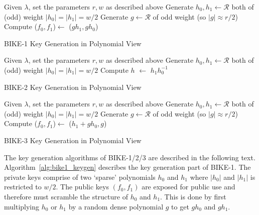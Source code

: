\documentclass[runningheads]{llncs}
\begin{document}
\begin{algorithm}[!tbh]
 \DontPrintSemicolon %
    Given $\lambda$, set the parameters $r,w$ as described above\;
    Generate $h_0,h_1 \gets \mathcal{R}$ both of (odd) weight $|h_0|=|h_1|=w/2$\;
    Generate $g \gets \mathcal{R}$ of odd weight (so $|g|\approx r/2$)\;
    Compute ($f_0,f_1$)$\gets$ ($gh_1,gh_0$)\;
 \caption{BIKE-1 Key Generation in Polynomial View \cite{aragon2017bike}}\label{alg:bike1_keygen}
\end{algorithm}

\begin{algorithm}[!tbh]
 \DontPrintSemicolon %
    Given $\lambda$, set the parameters $r,w$ as described above\;
    Generate $h_0,h_1 \gets \mathcal{R}$ both of (odd) weight $|h_0|=|h_1|=w/2$\;
    Compute $h$ $\gets$ $h_1h_0^{-1}$\;
 \caption{BIKE-2 Key Generation in Polynomial View  \cite{aragon2017bike}}\label{alg:bike2_keygen}
\end{algorithm}

\begin{algorithm}[!tbh]
 \DontPrintSemicolon %
    Given $\lambda$, set the parameters $r,w$ as described above\;
    Generate $h_0,h_1 \gets \mathcal{R}$ both of (odd) weight $|h_0|=|h_1|=w/2$\;
    Generate $g \gets \mathcal{R}$ of odd weight (so $|g|\approx r/2$)\;
    Compute ($f_0,f_1$)$\gets$ ($h_1+gh_0,g$)\;
 \caption{BIKE-3 Key Generation in Polynomial View  \cite{aragon2017bike}}\label{alg:bike3_keygen}
\end{algorithm}



The key generation algorithms of BIKE-1/2/3 are described in the following text.
Algorithm~\ref{alg:bike1_keygen} describes the key generation part of BIKE-1. The private keys comprise of two `sparse' polynomials $h_0$ and $h_1$ where $|h_0|$ and $|h_1|$ is restricted to $w/2$. The public keys $(f_0,f_1)$ are exposed for public use and therefore must scramble the structure of $h_0$ and $h_1$. This is done by first multiplying $h_0$ or $h_1$ by a random dense polynomial $g$ to get $gh_0$ and $gh_1$.
\end{document}
